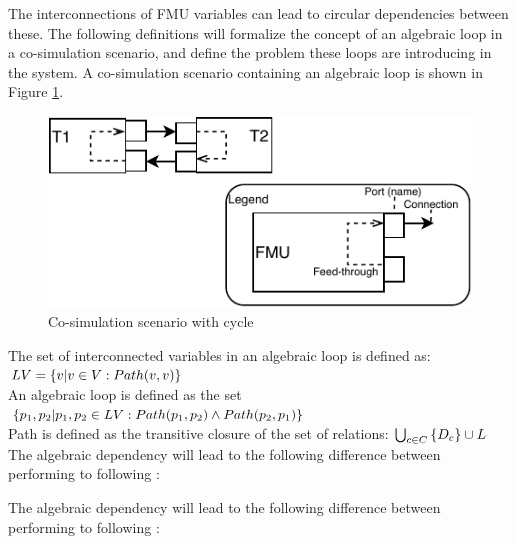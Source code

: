 The interconnections of FMU variables can lead to circular dependencies between these. The following definitions will formalize the concept of an algebraic loop in a co-simulation scenario, and define the problem these loops are introducing in the system. A co-simulation scenario containing an algebraic loop is shown in Figure \ref{fig:fmu_cycle}.

\begin{figure}
    \centering
    \includegraphics{images/fmu_cycle.pdf}
    \caption{Co-simulation scenario with cycle}
    \label{fig:fmu_cycle}
\end{figure}

\begin{definition} 
The set of interconnected variables in an algebraic loop is defined as: $LV = \{v | v \in V : Path(v,v)\}$ \\
An algebraic loop is defined as the set $\{p_1, p_2 | p_1, p_2 \in LV: Path(p_1, p_2) \land Path(p_2, p_1)\}$\\
Path is defined as the transitive closure of the set of relations: $\bigcup_{c \in C}  \left\{ D_{c} \right\} \cup L$\\
The algebraic dependency will lead to the following difference between performing to following :
\end{definition}

\begin{definition}\label{def:challenge}
The algebraic dependency will lead to the following difference between performing to following :
\end{definition}

